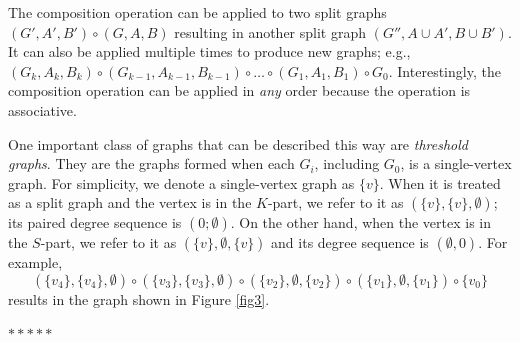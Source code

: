 \documentclass[11pt]{article}
\begin{document}
	The composition operation can be applied to two split graphs $(G', A', B') \circ (G, A, B)$ resulting in another split graph $(G'', A \cup A', B \cup B')$.  It can also be applied 
multiple  times to produce new graphs; e.g.,  $(G_k , A_k, B_k) \circ (G_{k-1}, A_{k-1}, B_{k-1})  \circ \hdots \circ (G_1, A_1, B_1) \circ G_0$.    Interestingly, the composition operation can be applied in {\it any} order because the operation is associative.

	
	
One important class of graphs that can be described this way are {\it threshold graphs}.  They are the graphs formed when each $G_i$, including $G_0$, is a single-vertex graph.   For simplicity, we denote a single-vertex graph as $\{v\}$.  When it is treated as a split graph and the vertex is in the $K$-part, we refer to it as $(\{v\}, \{v\}, \emptyset)$; its paired degree sequence is $(0; \emptyset)$.  On the other hand, 
 when the vertex is in the $S$-part, we refer to it as $(\{v\}, \emptyset, \{v\})$ and its degree sequence is $(\emptyset, 0)$.
 For example, 
$$(\{v_4\}, \{v_4\}, \emptyset) \circ (\{v_3\}, \{v_3\}, \emptyset) \circ  (\{v_2\}, \emptyset, \{v_2\}) \circ  (\{v_1\}, \emptyset, \{v_1\})  \circ \{v_0 \} $$
results in the graph shown in Figure \ref{fig3}.    %
	

\medskip	
\bigskip %
\centerline{$*  *  *  * *$}
\bigskip %
\medskip

\end{document}
